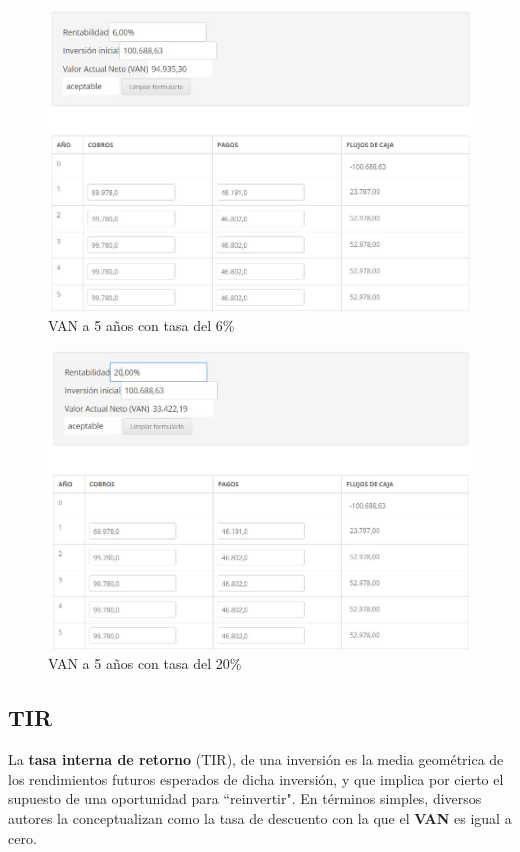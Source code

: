 \documentclass[12pt,a4paper]{book}
\begin{document}
\begin{figure} [H]
\centering
\includegraphics[width= 13 cm]{../figuras/VAN_5anios_6rentabilidad.jpg}
\caption{VAN a 5 años con tasa del 6\%}
\label{fig_VAN_5_tasa6}
\end{figure}

\begin{figure} [H]
\centering
\includegraphics[width= 13 cm]{../figuras/VAN_5anios_20rentabilidad.jpg}
\caption{VAN a 5 años con tasa del 20\%}
\label{fig_VAN_5_tasa20}
\end{figure}
 
\subsection{TIR}
La \textbf{tasa interna de retorno} (TIR), de una inversión es la media geométrica de los rendimientos futuros esperados de dicha inversión, y que implica por cierto el supuesto de una oportunidad para ``reinvertir". En términos simples, diversos autores la conceptualizan como la tasa de descuento con la que el \textbf{VAN} es igual a cero.
\end{document}
